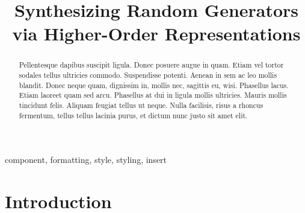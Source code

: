 \documentclass[conference]{IEEEtran}
\begin{document}
\title{Synthesizing Random Generators via Higher-Order Representations}

\author{
\and
{}
}

\maketitle


\begin{abstract}

  Pellentesque dapibus suscipit ligula. Donec posuere augue in quam. Etiam vel
  tortor sodales tellus ultricies commodo. Suspendisse potenti. Aenean in sem ac
  leo mollis blandit. Donec neque quam, dignissim in, mollis nec, sagittis eu,
  wisi. Phasellus lacus. Etiam laoreet quam sed arcu. Phasellus at dui in ligula
  mollis ultricies. Mauris mollis tincidunt felis. Aliquam feugiat tellus ut
  neque. Nulla facilisis, risus a rhoncus fermentum, tellus tellus lacinia
  purus, et dictum nunc justo sit amet elit.

\end{abstract}

\begin{IEEEkeywords}
component, formatting, style, styling, insert
\end{IEEEkeywords}


\section{Introduction}
\end{document}
